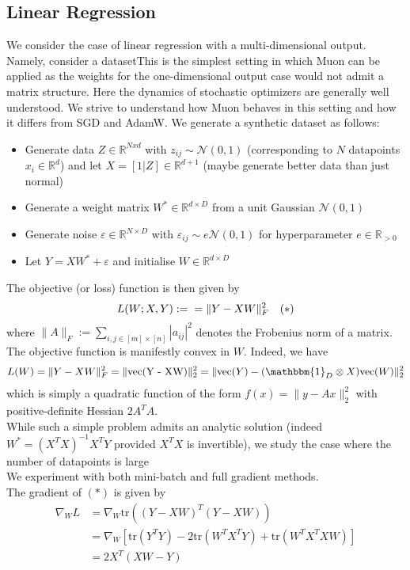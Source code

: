 \documentclass[12pt]{book}
\newcommand{\R}{\mathbb{R}}
\begin{document}
\subsection{Linear Regression}
We consider the case of linear regression with a multi-dimensional output. Namely, consider a datasetThis is the simplest setting in which Muon can be applied as the weights for the one-dimensional output case would not admit a matrix structure. 
Here the dynamics of stochastic optimizers are generally well understood. We strive to understand how Muon behaves in this setting and how it differs from SGD and AdamW. We generate a synthetic dataset as follows:
\begin{itemize}
	\item Generate data $Z\in \R^{Nxd}$ with $z_{ij}\sim \mathcal{N}(0,1)$ (corresponding to $N$ datapoints $x_i \in\R^{d}$) and let $X = [1 | Z] \in\R^{d+1} $ (maybe generate better data than just normal) 
	\item Generate a weight matrix $W^* \in \R^{d\times D}$ from a unit Gaussian $\mathcal{N}(0,1)$
	\item Generate noise $\varepsilon\in \R^{N\times D}$ with $\varepsilon _{ij} \sim e \mathcal{N}(0,1)$ for hyperparameter $e\in\R_{>0}$
	\item Let $Y = XW^* + \varepsilon $ and initialise $W\in\R^{d\times D}$
\end{itemize}
The objective (or loss) function is then given by 
\[
	L(W; X,Y) :=  \\ = \|Y - XW\|_F^{2}  \quad  (*)
\] 
where $\|A\|_F := \sum_{i,j \in [m]\times[n]}^{} {|a_{ij}|^2}$ denotes the Frobenius norm of a matrix. \\
The objective function is manifestly convex in $W$. Indeed, we have 
\begin{align*}
L(W) = \|Y - XW\|_F^2 = \|\text{vec(Y - XW)}\|_2^2 = \|\text{vec}(Y) - (\mathbbm{1}_D \otimes X) \text{vec} (W)\|_2^2  
\end{align*}
which is simply a quadratic function of the form $f(x) = \|y - Ax\|_2^2$ with positive-definite Hessian $2A^{T}A$. \\
While such a simple problem admits an analytic solution (indeed $W^* = (X^{T}X)^{-1}X^{T}Y$ provided $X^{T}X$ is invertible), we study the case where the number of datapoints is large   
\\
We experiment with both mini-batch and full gradient methods. \\
The gradient of $(*)$ is given by 
\begin{align*}
	\nabla_W L &= \nabla_W \text{tr}\left((Y - XW)^{T} (Y - XW)\right)\\
		   &= \nabla_W [\text{tr}(Y^TY)  - 2\text{tr}(W^{T}X^{T} Y) + \text{tr}(W^{T}X^{T}XW)]   \\
		   &= 2X^{T}(XW - Y)
\end{align*}
\end{document}
